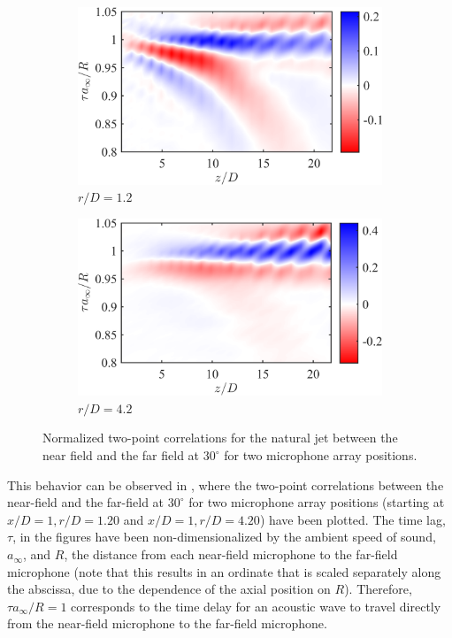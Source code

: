 \begin{figure}
	\centering
	\begin{subfigure}{.5\textwidth}
		\centering
		\includegraphics[width=0.95\linewidth]{Figures/ch3_St000_xcorr_r1D.png}
		\caption{$r/D = 1.2$}
		\label{fig:ch3_fullxcorr_r1D}
	\end{subfigure}%
	\begin{subfigure}{.5\textwidth}
		\centering
		\includegraphics[width=0.95\linewidth]{Figures/ch3_St000_xcorr_r4D.png}
		\caption{$r/D = 4.2$}
		\label{fig:ch3_fullxcorr_r4D}
	\end{subfigure}
	\caption{Normalized two-point correlations for the natural jet between the near field and the far field at $30^\circ$ for two microphone array positions.}
	\label{fig:ch3_fullxcorr}
\end{figure}

This behavior can be observed in , where the two-point correlations between the near-field and the far-field at $30^\circ$ for two microphone array positions (starting at $x/D = 1, r/D = 1.20$ and $x/D = 1, r/D = 4.20$) have been plotted.
The time lag, $\tau$, in the figures have been non-dimensionalized by the ambient speed of sound, $a_\infty$, and $R$, the distance from each near-field microphone to the far-field microphone (note that this results in an ordinate that is scaled separately along the abscissa, due to the dependence of the axial position on $R$).
Therefore, $\tau a_\infty /R = 1$ corresponds to the time delay for an acoustic wave to travel directly from the near-field microphone to the far-field microphone.

